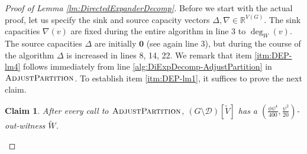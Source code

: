 \documentclass[11pt]{article}
\newtheorem{claim}[theorem]{Claim}
\newcommand\R{\mathbb{R}}
\begin{document}
\begin{proof}[Proof of Lemma \ref{lm:DirectedExpanderDecomp}]
Before we start with the actual proof, let us specify the sink and source capacity vectors $\Delta, \nabla \in \R^{V(G)}$. The sink capacities $\nabla(v)$ are fixed during the entire algorithm in line 3 to $\deg_W(v)$. The source capacities $\Delta$ are initially $\boldsymbol{0}$ (see again line 3), but during the course of the algorithm $\Delta$ is increased in lines 8, 14, 22. We remark that item \ref{itm:DEP-lm4} follows immediately from line \ref{alg:DiExpDecomp-AdjustPartition} in $\textsc{AdjustPartition}$. To establish item \ref{itm:DEP-lm1}, it suffices to prove the next claim.

\begin{claim}
    After every call to $\textsc{AdjustPartition}$, $(G \setminus \mathcal{D})[\tilde{V}]$ has a $\left(\frac{\phi \psi^4}{400}, \frac{\psi^2}{20}\right)$-out-witness $\tilde{W}$.
\end{claim}


\end{proof}
\end{document}
